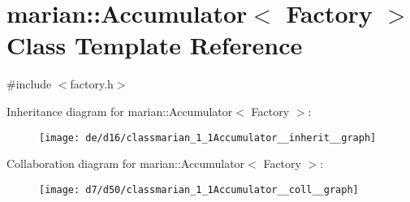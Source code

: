 \hypertarget{classmarian_1_1Accumulator}{}\section{marian\+:\+:Accumulator$<$ Factory $>$ Class Template Reference}
\label{classmarian_1_1Accumulator}


{\ttfamily \#include $<$factory.\+h$>$}



Inheritance diagram for marian\+:\+:Accumulator$<$ Factory $>$\+:
\nopagebreak
\begin{figure}[H]
\begin{center}
\leavevmode
\texttt{[image: de/d16/classmarian\_1\_1Accumulator\_\_inherit\_\_graph]}
\end{center}
\end{figure}


Collaboration diagram for marian\+:\+:Accumulator$<$ Factory $>$\+:
\nopagebreak
\begin{figure}[H]
\begin{center}
\leavevmode
\texttt{[image: d7/d50/classmarian\_1\_1Accumulator\_\_coll\_\_graph]}
\end{center}
\end{figure}
